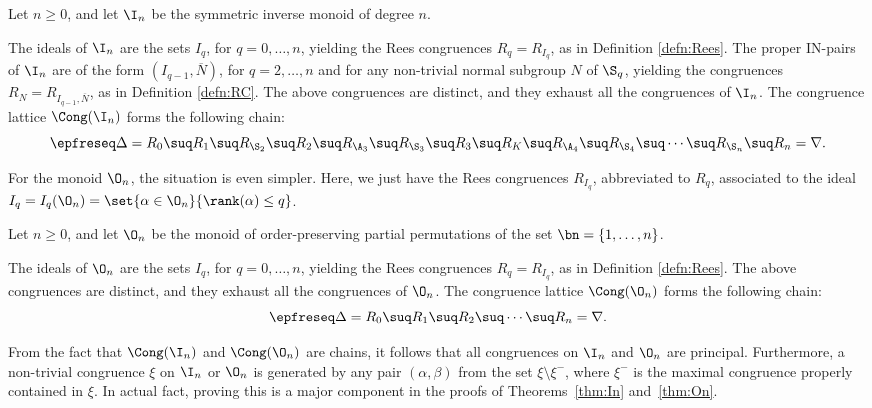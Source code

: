 \begin{thm}\label{thm:In}
Let $n\geq0$, and let $\I_n$ be the symmetric inverse monoid of degree $n$.
\begin{itemize}
 The ideals of $\I_n$ are the sets $I_q$, for $q=0,\ldots,n$, yielding the Rees congruences $R_q=R_{I_q}$, as in Definition \ref{defn:Rees}.
 The proper IN-pairs of $\I_n$ are of the form $(I_{q-1},\overline N)$, for $q=2,\ldots,n$ and for any non-trivial normal subgroup $N$ of $\S_q$, yielding the congruences $R_N=R_{I_{q-1},\overline N}$, as in Definition \ref{defn:RC}.
 The above congruences are distinct, and they exhaust all the congruences of $\I_n$.
 The congruence lattice $\Cong(\I_n)$ forms the following chain:
\[
\epfreseq
\Delta=R_0 \suq R_1 \suq R_{\S_2} \suq R_2 \suq R_{\A_3} \suq R_{\S_3} \suq R_3 \suq R_K \suq R_{\A_4} \suq R_{\S_4}  \suq \cdots \suq R_{\S_n}\suq R_n = \nabla.
\]
\end{itemize}
\end{thm}



For the monoid $\O_n$, the situation is even simpler.  Here, we just have the Rees congruences $R_{I_q}$, abbreviated to $R_q$, associated to the ideal $I_q=I_q(\O_n)=\set{\alpha\in\O_n}{\rank(\alpha)\leq q}$.



\begin{thm}
\label{thm:On}
Let $n\geq0$, and let $\O_n$ be the monoid of order-preserving partial permutations of the set $\bn=\{1,\ldots,n\}$.
\begin{itemize}
 The ideals of $\O_n$ are the sets $I_q$, for $q=0,\ldots,n$, yielding the Rees congruences $R_q=R_{I_q}$, as in Definition \ref{defn:Rees}.
 The above congruences are distinct, and they exhaust all the congruences of $\O_n$.
 The congruence lattice $\Cong(\O_n)$ forms the following chain:
\[
\epfreseq
\Delta = R_0 \suq R_1 \suq R_2 \suq\cdots\suq R_n = \nabla.
\]
\end{itemize}
\end{thm}


\begin{rem}
\label{rem:InOnPrinc}
  From the fact that $\Cong(\I_n)$ and $\Cong(\O_n)$ are chains, it follows
  that all congruences on $\I_n$ and $\O_n$ are principal.  Furthermore, a non-trivial
  congruence $\xi$ on $\I_n$ or $\O_n$ is generated by any pair $(\alpha,\beta)$ from the set
  $\xi\setminus\xi^-$, where $\xi^-$ is the maximal congruence properly contained in
  $\xi$.  In actual fact, proving this is a major component in the proofs of
  Theorems~\ref{thm:In} and~\ref{thm:On}.
\end{rem}




